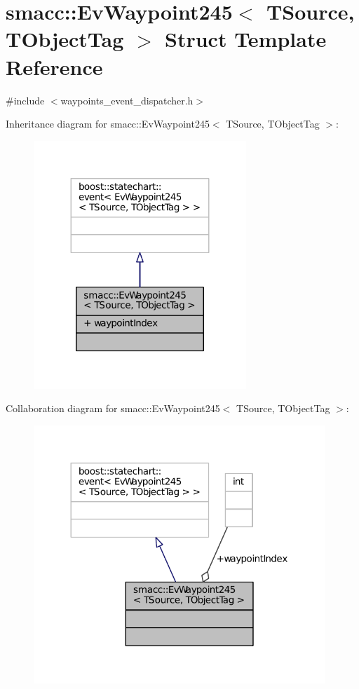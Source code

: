 \hypertarget{structsmacc_1_1EvWaypoint245}{}\section{smacc\+:\+:Ev\+Waypoint245$<$ T\+Source, T\+Object\+Tag $>$ Struct Template Reference}
\label{structsmacc_1_1EvWaypoint245}


{\ttfamily \#include $<$waypoints\+\_\+event\+\_\+dispatcher.\+h$>$}



Inheritance diagram for smacc\+:\+:Ev\+Waypoint245$<$ T\+Source, T\+Object\+Tag $>$\+:
\nopagebreak
\begin{figure}[H]
\begin{center}
\leavevmode
\includegraphics[width=227pt]{structsmacc_1_1EvWaypoint245__inherit__graph}
\end{center}
\end{figure}


Collaboration diagram for smacc\+:\+:Ev\+Waypoint245$<$ T\+Source, T\+Object\+Tag $>$\+:
\nopagebreak
\begin{figure}[H]
\begin{center}
\leavevmode
\includegraphics[width=312pt]{structsmacc_1_1EvWaypoint245__coll__graph}
\end{center}
\end{figure}
